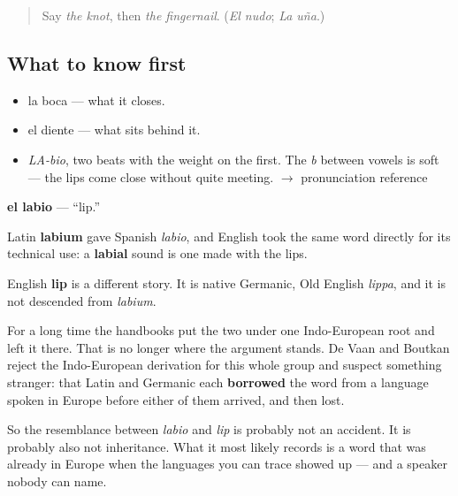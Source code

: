 \label{lesson:ES-C375-labio}



\begin{quote}
Say \emph{the knot}, then \emph{the fingernail}. (\emph{El nudo}; \emph{La uña}.)
\end{quote}

\subsection*{What to know first}
\begin{itemize}
\raggedright
  \item la boca — what it closes.
  \item el diente — what sits behind it.
\end{itemize}

\begin{sounds}
\begin{itemize}
\raggedright
  \item \emph{LA-bio}, two beats with the weight on the first. The \emph{b} between vowels is soft — the lips come close without quite meeting. $\to$ pronunciation reference
\end{itemize}
\end{sounds}

\begin{cousinweb}
\textbf{el labio} — \textquotedblleft{}lip.\textquotedblright{}

Latin \textbf{labium} gave Spanish \emph{labio}, and English took the same word directly for its technical use: a \textbf{labial} sound is one made with the lips.

English \textbf{lip} is a different story. It is native Germanic, Old English \emph{lippa}, and it is not descended from \emph{labium}.

For a long time the handbooks put the two under one Indo-European root and left it there. That is no longer where the argument stands. De Vaan and Boutkan reject the Indo-European derivation for this whole group and suspect something stranger: that Latin and Germanic each \textbf{borrowed} the word from a language spoken in Europe before either of them arrived, and then lost.

So the resemblance between \emph{labio} and \emph{lip} is probably not an accident. It is probably also not inheritance. What it most likely records is a word that was already in Europe when the languages you can trace showed up — and a speaker nobody can name.
\end{cousinweb}

